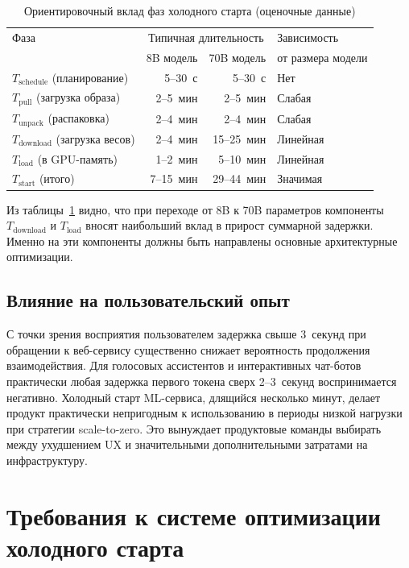 \begin{table}[htbp]
\centering
\caption{Ориентировочный вклад фаз холодного старта (оценочные данные)}
\label{tab:cold_start_components}
\begin{tabular}{lrrl}
\toprule
Фаза & \multicolumn{2}{c}{Типичная длительность} & Зависимость \\
     & 8B модель & 70B модель & от размера модели \\
\midrule
$T_{\mathrm{schedule}}$ (планирование) & 5--30~с   & 5--30~с   & Нет \\
$T_{\mathrm{pull}}$ (загрузка образа)  & 2--5~мин  & 2--5~мин  & Слабая \\
$T_{\mathrm{unpack}}$ (распаковка)     & 2--4~мин  & 2--4~мин  & Слабая \\
$T_{\mathrm{download}}$ (загрузка весов) & 2--4~мин & 15--25~мин & Линейная \\
$T_{\mathrm{load}}$ (в GPU-память)     & 1--2~мин  & 5--10~мин & Линейная \\
\midrule
$T_{\mathrm{start}}$ (итого)           & 7--15~мин & 29--44~мин & Значимая \\
\bottomrule
\end{tabular}
\end{table}

Из таблицы~\ref{tab:cold_start_components} видно, что при переходе от 8B к 70B параметров компоненты $T_{\mathrm{download}}$ и $T_{\mathrm{load}}$ вносят наибольший вклад в прирост суммарной задержки. Именно на эти компоненты должны быть направлены основные архитектурные оптимизации.

\subsection{Влияние на пользовательский опыт}

С точки зрения восприятия пользователем задержка свыше 3~секунд при обращении к веб-сервису существенно снижает вероятность продолжения взаимодействия. Для голосовых ассистентов и интерактивных чат-ботов практически любая задержка первого токена сверх 2--3~секунд воспринимается негативно. Холодный старт ML-сервиса, длящийся несколько минут, делает продукт практически непригодным к использованию в периоды низкой нагрузки при стратегии scale-to-zero. Это вынуждает продуктовые команды выбирать между ухудшением UX и значительными дополнительными затратами на инфраструктуру.

\section{Требования к системе оптимизации холодного старта}

